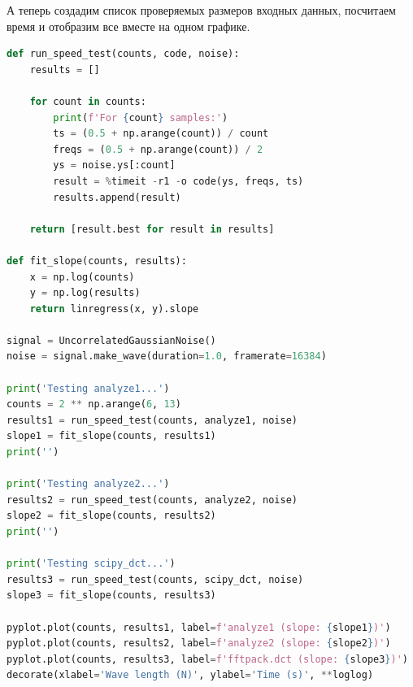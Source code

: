 \documentclass[a4paper,12pt]{report}
\begin{document}
    А теперь создадим список проверяемых размеров входных данных, посчитаем время и отобразим все вместе на одном графике.
    
\begin{lstlisting}[language=Python,caption=Замеры]
def run_speed_test(counts, code, noise):
    results = []
    
    for count in counts:
        print(f'For {count} samples:')
        ts = (0.5 + np.arange(count)) / count
        freqs = (0.5 + np.arange(count)) / 2
        ys = noise.ys[:count]
        result = %timeit -r1 -o code(ys, freqs, ts)
        results.append(result)
        
    return [result.best for result in results]

def fit_slope(counts, results):
    x = np.log(counts)
    y = np.log(results)
    return linregress(x, y).slope

signal = UncorrelatedGaussianNoise()
noise = signal.make_wave(duration=1.0, framerate=16384)

print('Testing analyze1...')
counts = 2 ** np.arange(6, 13)
results1 = run_speed_test(counts, analyze1, noise)
slope1 = fit_slope(counts, results1)
print('')

print('Testing analyze2...')
results2 = run_speed_test(counts, analyze2, noise)
slope2 = fit_slope(counts, results2)
print('')

print('Testing scipy_dct...')
results3 = run_speed_test(counts, scipy_dct, noise)
slope3 = fit_slope(counts, results3)

pyplot.plot(counts, results1, label=f'analyze1 (slope: {slope1})')
pyplot.plot(counts, results2, label=f'analyze2 (slope: {slope2})')
pyplot.plot(counts, results3, label=f'fftpack.dct (slope: {slope3})')
decorate(xlabel='Wave length (N)', ylabel='Time (s)', **loglog)
\end{lstlisting}


\end{document}
